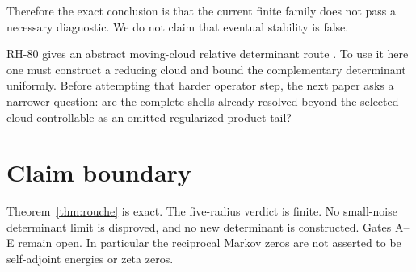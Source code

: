 \documentclass[11pt]{article}
\theoremstyle{remark}\newtheorem{remark}[theorem]{Remark}
\begin{document}
Therefore the exact conclusion is that the current finite family does not
pass a necessary diagnostic. We do not claim that eventual stability is
false.

RH-80 gives an abstract moving-cloud relative determinant route
\citep{WangRH80}. To use it here one must construct a reducing cloud and bound
the complementary determinant uniformly. Before attempting that harder
operator step, the next paper asks a narrower question: are the complete
shells already resolved beyond the selected cloud controllable as an
omitted regularized-product tail?

\section{Claim boundary}

Theorem~\ref{thm:rouche} is exact. The five-radius verdict is finite.
No small-noise determinant limit is disproved, and no new determinant is
constructed. Gates A--E remain open. In particular the reciprocal Markov
zeros are not asserted to be self-adjoint energies or zeta zeros.



\end{document}
